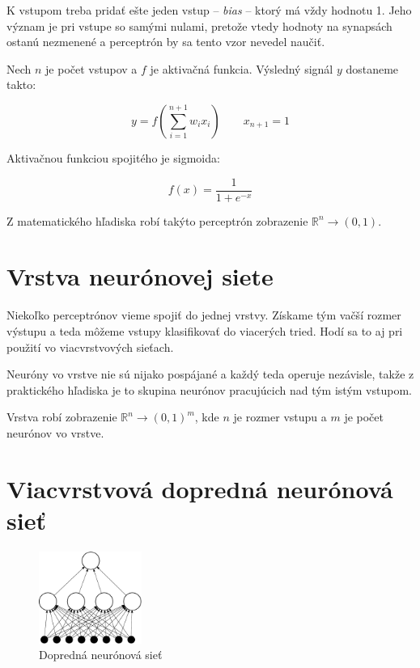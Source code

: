 K vstupom treba pridať ešte jeden vstup -- \textit{bias} -- ktorý má vždy hodnotu 1. Jeho význam je pri vstupe so samými nulami, pretože vtedy hodnoty na synapsách ostanú nezmenené a perceptrón by sa tento vzor nevedel naučiť.

Nech $n$ je počet vstupov a  $f$ je aktivačná funkcia. Výsledný signál $y$ dostaneme takto:

$$y= f\left(\sum_{i=1}^{n+1} w_i x_i \right)\qquad x_{n+1}=1$$\medskip

Aktivačnou funkciou spojitého je sigmoida: 

$$f(x) = \frac{1}{1+e^{-x}}$$\medskip

Z matematického hľadiska robí takýto perceptrón zobrazenie $\mathbb{R}^n\rightarrow (0,1)$.

\section{Vrstva neurónovej siete}

Niekoľko perceptrónov vieme spojiť do jednej vrstvy. Získame tým vačší rozmer výstupu a teda môžeme vstupy klasifikovať do viacerých tried. Hodí sa to aj pri použití vo viacvrstvových sieťach.

Neuróny vo vrstve nie sú nijako pospájané a každý teda operuje nezávisle, takže z praktického hľadiska je to skupina neurónov pracujúcich nad tým istým vstupom.

Vrstva robí zobrazenie $\mathbb{R}^n\rightarrow (0,1)^m$, kde $n$ je rozmer vstupu a $m$ je počet neurónov vo vrstve.

\section{Viacvrstvová dopredná neurónová sieť}\label{chap:ffnn}

\begin{figure}[htbp]
  \begin{center}
    \includegraphics[width=0.3\textwidth]{images/ffnn}
  \end{center}
  \caption{Dopredná neurónová sieť}
  \label{fig:ffnn}
\end{figure}

